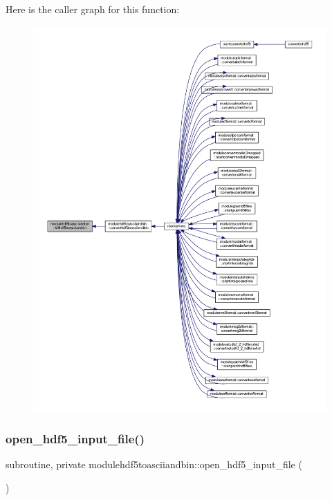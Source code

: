 Here is the caller graph for this function\+:\nopagebreak
\begin{figure}[H]
\begin{center}
\leavevmode
\includegraphics[width=350pt]{namespacemodulehdf5toasciiandbin_ae236e6042f891aa8f0a07236763a82d6_icgraph}
\end{center}
\end{figure}
\mbox{\label{namespacemodulehdf5toasciiandbin_ac11d594ac1ad5acf256f4066315f5028}} 
\subsubsection{\texorpdfstring{open\+\_\+hdf5\+\_\+input\+\_\+file()}{open\_hdf5\_input\_file()}}
{\footnotesize\ttfamily subroutine, private modulehdf5toasciiandbin\+::open\+\_\+hdf5\+\_\+input\+\_\+file (\begin{DoxyParamCaption}{ }\end{DoxyParamCaption})\hspace{0.3cm}{\ttfamily [private]}}

